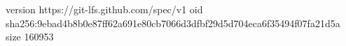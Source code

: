 version https://git-lfs.github.com/spec/v1
oid sha256:9ebad4b8b0e87ff62a691e80cb7066d3dfbf29d5d704eca6f35494f07fa21d5a
size 160953
